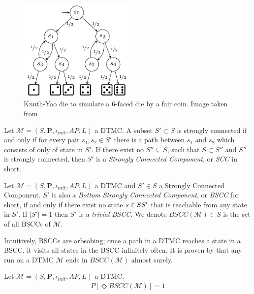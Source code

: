 \begin{example}
    \begin{figure}[H]
        \centering
        \includegraphics[width=0.5\textwidth]{figures/knuth_die.png}
        \caption{Knuth-Yao die to simulate a 6-faced die by a fair coin. Image taken from
            \cite{katoen2016probabilistic}}
        \label{fig:knuth-die}
    \end{figure}
\end{example}

\begin{definition}
    Let $\mathcal{M}=(S,\mathbf{P}, \iota_{init}, AP,L)$ a DTMC. A subset $S'\subset S$ is strongly
    connected if and only if for every pair $s_1,s_2\in S'$ there is a path between $s_1$ and $s_2$
    which consists of only of state in $S'$. If there exist no $S''\subseteq S$, such that $S\subset
        S''$ and $S''$ is strongly connected, then $S'$ is a \textit{Strongly Connected Component}, or
    \textit{SCC} in short.
\end{definition}

\begin{definition}
    Let $\mathcal{M}=(S,\mathbf{P}, \iota_{init}, AP,L)$ a DTMC and $S'\in S$ a Strongly Connected
    Component. $S'$ is also a \textit{Bottom Strongly Connected Component}, or \textit{BSCC} for
    short, if and only if there exist no state $s \in S\\S'$ that is reachable from any state in
    $S'$. If $|S'|=1$ then $S'$ is a \textit{trivial BSCC}. We denote $BSCC(\mathcal{M})\in S$ is
    the set of all BSCCs of $\mathcal{M}$.
\end{definition}
Intuitively, BSCCs are arbsobing; once a path in a DTMC reaches a state in a BSCC, it visits  all
states in the BSCC infinitely often. It is proven by \cite{baier2008principles} that any run on a
DTMC $\mathcal{M}$ ends in $BSCC(\mathcal{M})$ almost surely.
\begin{theorem}
    Let $\mathcal{M}=(S,\mathbf{P}, \iota_{init}, AP,L)$ a DTMC.
    \begin{align*}
        P[\Diamond BSCC(\mathcal{M})] = 1
    \end{align*}
\end{theorem}

